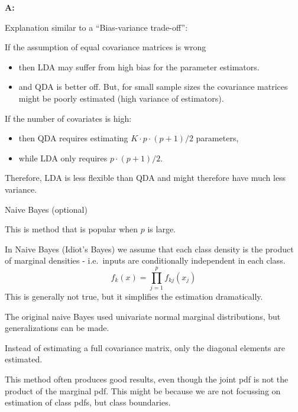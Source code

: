 \documentclass[10pt,ignorenonframetext,]{beamer}
\providecommand{\tightlist}{%
  \setlength{\itemsep}{0pt}\setlength{\parskip}{0pt}}
\begin{document}
\begin{frame}

\textbf{A:}

Explanation similar to a ``Bias-variance trade-off'':

If the assumption of equal covariance matrices is wrong

\begin{itemize}
\tightlist
\item
  then LDA may suffer from high bias for the parameter estimators.
\item
  and QDA is better off. But, for small sample sizes the covariance
  matrices might be poorly estimated (high variance of estimators).
\end{itemize}

If the number of covariates is high:

\begin{itemize}
\tightlist
\item
  then QDA requires estimating \(K\cdot p \cdot (p+1)/2\) parameters,
\item
  while LDA only requires \(p\cdot(p+1)/2\).
\end{itemize}

Therefore, LDA is less flexible than QDA and might therefore have much
less variance.

\end{frame}

\begin{frame}

\begin{block}{Naive Bayes (optional)}

This is method that is popular when \(p\) is large.

In Naive Bayes (Idiot's Bayes) we assume that each class density is the
product of marginal densities - i.e.~inputs are conditionally
independent in each class. \[f_k(x)=\prod_{j=1}^p f_{kj}(x_j)\] This is
generally not true, but it simplifies the estimation dramatically.

The original naive Bayes used univariate normal marginal distributions,
but generalizations can be made.

Instead of estimating a full covariance matrix, only the diagonal
elements are estimated.

This method often produces good results, even though the joint pdf is
not the product of the marginal pdf. This might be because we are not
focussing on estimation of class pdfs, but class boundaries.

\end{block}

\end{frame}
\end{document}
